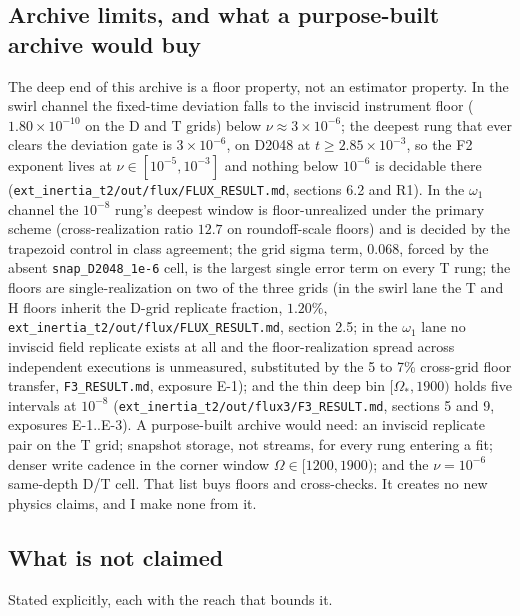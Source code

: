 \subsection{Archive limits, and what a purpose-built archive would buy}

The deep end of this archive is a floor property, not an estimator
property. In the swirl channel the fixed-time deviation falls to the
inviscid instrument floor ($1.80\times10^{-10}$ on the D and T grids)
below $\nu \approx 3\times10^{-6}$; the deepest rung that ever clears
the deviation gate is $3\times10^{-6}$, on D2048 at
$t \ge 2.85\times10^{-3}$, so the F2 exponent lives at
$\nu \in [10^{-5}, 10^{-3}]$ and nothing below $10^{-6}$ is decidable
there (\texttt{ext\_inertia\_t2/out/flux/FLUX\_RESULT.md}, sections 6.2
and R1). In the $\omega_1$ channel the $10^{-8}$ rung's deepest window
is floor-unrealized under the primary scheme (cross-realization ratio
$12.7$ on roundoff-scale floors) and is decided by the trapezoid
control in class agreement; the grid sigma term, $0.068$, forced by the
absent \texttt{snap\_D2048\_1e-6} cell, is the largest single error
term on every T rung; the floors are single-realization on two of the
three grids (in the swirl lane the T and H floors inherit the D-grid
replicate fraction, $1.20\%$,
\texttt{ext\_inertia\_t2/out/flux/FLUX\_RESULT.md}, section 2.5; in the
$\omega_1$ lane no inviscid field replicate exists at all and the
floor-realization spread across independent executions is unmeasured,
substituted by the 5 to 7\% cross-grid floor transfer,
\texttt{F3\_RESULT.md}, exposure E-1); and the thin deep bin
$[\Omega_*, 1900)$ holds five intervals at $10^{-8}$
(\texttt{ext\_inertia\_t2/out/flux3/F3\_RESULT.md}, sections 5 and 9,
exposures E-1..E-3). A purpose-built archive would need: an inviscid
replicate pair on the T grid; snapshot storage, not streams, for every
rung entering a fit; denser write cadence in the corner window
$\Omega \in [1200, 1900)$; and the $\nu = 10^{-6}$ same-depth D/T cell.
That list buys floors and cross-checks. It creates no new physics
claims, and I make none from it.

\subsection{What is not claimed}

Stated explicitly, each with the reach that bounds it.

